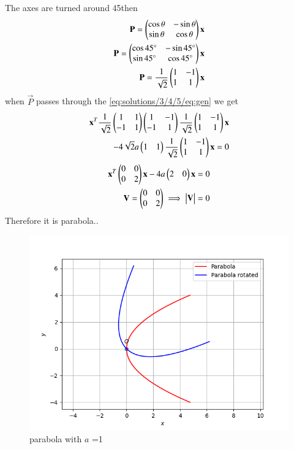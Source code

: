 The axes are turned around 45\degree then 
\begin{align}
    \mathbf{P}=\begin{pmatrix}\cos\theta & -\sin\theta \\ \sin\theta & \cos\theta\end{pmatrix}\mathbf{x}\\
    \mathbf{P}=\begin{pmatrix}\cos45\degree & -\sin45\degree \\ \sin45\degree & \cos45\degree\end{pmatrix}\mathbf{x}\\
    \mathbf{P} = \frac{1}{\sqrt{2}}\begin{pmatrix}1&-1\\1&1\end{pmatrix}\mathbf{x}
\end{align}
when $\vec{P}$ passes through the \eqref{eq:solutions/3/4/5/eq:gen} we get
\begin{multline}
\begin{aligned}
\mathbf{x}^T\frac{1}{\sqrt{2}}\begin{pmatrix}1&1\\-1&1\end{pmatrix}\begin{pmatrix}1&-1\\-1&1\end{pmatrix}\frac{1}{\sqrt{2}}\begin{pmatrix}1&-1\\1&1\end{pmatrix}\mathbf{x}\\-4\sqrt{2}a\begin{pmatrix}1&1\end{pmatrix}\frac{1}{\sqrt{2}}\begin{pmatrix}1&-1\\1&1\end{pmatrix}\mathbf{x}=0
\end{aligned}
\end{multline}
\begin{align}
    \mathbf{x}^T\begin{pmatrix}0&0\\0&2\end{pmatrix}\mathbf{x}-4a\begin{pmatrix}2&0\end{pmatrix}\mathbf{x}=0\\
    \mathbf{V}=\begin{pmatrix}0&0\\0&2\end{pmatrix}\implies\begin{vmatrix}\mathbf{V}\end{vmatrix}=0
\end{align}
Therefore it is parabola..
\begin{figure}[!ht]
\centering
\includegraphics[width=\columnwidth]{./solutions/3/4/5/parabola.png}
\caption{ parabola with $a$ =1}
\label{eq:solutions/3/4/5/Fig}
\end{figure}
